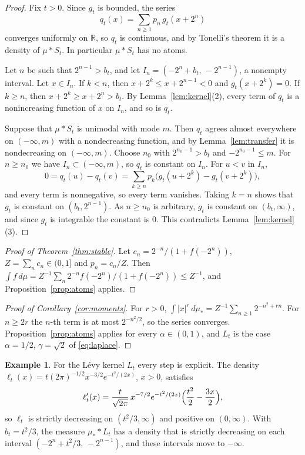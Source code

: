 \documentclass[11pt]{amsart}
\numberwithin{equation}{section}
\theoremstyle{definition}
\newtheorem{example}[theorem]{Example}
\theoremstyle{remark}
\newcommand{\R}{\mathbb R}
\begin{document}
\begin{proof}
Fix $t>0$. Since $g_t$ is bounded, the series
\[
q_t(x)=\sum_{n\ge1}p_n\,g_t(x+2^n)
\]
converges uniformly on $\R$, so $q_t$ is continuous, and by Tonelli's theorem it is a density of $\mu\ast S_t$. In particular $\mu\ast S_t$ has no atoms.

Let $n$ be such that $2^{n-1}>b_t$, and let $I_n=(-2^n+b_t,\,-2^{n-1})$, a nonempty interval. Let $x\in I_n$. If $k<n$, then $x+2^k\le x+2^{n-1}<0$ and $g_t(x+2^k)=0$. If $k\ge n$, then $x+2^k\ge x+2^n>b_t$. By Lemma~\ref{lem:kernel}(2), every term of $q_t$ is a nonincreasing function of $x$ on $I_n$, and so is $q_t$.

Suppose that $\mu\ast S_t$ is unimodal with mode $m$. Then $q_t$ agrees almost everywhere on $(-\infty,m)$ with a nondecreasing function, and by Lemma~\ref{lem:transfer} it is nondecreasing on $(-\infty,m)$. Choose $n_0$ with $2^{n_0-1}>b_t$ and $-2^{n_0-1}\le m$. For $n\ge n_0$ we have $I_n\subset(-\infty,m)$, so $q_t$ is constant on $I_n$. For $u<v$ in $I_n$,
\[
0=q_t(u)-q_t(v)=\sum_{k\ge n}p_k\bigl(g_t(u+2^k)-g_t(v+2^k)\bigr),
\]
and every term is nonnegative, so every term vanishes. Taking $k=n$ shows that $g_t$ is constant on $(b_t,2^{n-1})$. As $n\ge n_0$ is arbitrary, $g_t$ is constant on $(b_t,\infty)$, and since $g_t$ is integrable the constant is $0$. This contradicts Lemma~\ref{lem:kernel}(3).
\end{proof}

\begin{proof}[Proof of Theorem~\ref{thm:stable}]
Let $c_n=2^{-n}/(1+f(-2^n))$, $Z=\sum_nc_n\in(0,1]$ and $p_n=c_n/Z$. Then $\int f\,d\mu=Z^{-1}\sum_n2^{-n}f(-2^n)/(1+f(-2^n))\le Z^{-1}$, and Proposition~\ref{prop:atoms} applies.
\end{proof}

\begin{proof}[Proof of Corollary~\ref{cor:moments}]
For $r>0$, $\int|x|^r\,d\mu_*=Z^{-1}\sum_{n\ge1}2^{-n^2+rn}$. For $n\ge2r$ the $n$-th term is at most $2^{-n^2/2}$, so the series converges. Proposition~\ref{prop:atoms} applies for every $\alpha\in(0,1)$, and $L_t$ is the case $\alpha=1/2$, $\gamma=\sqrt2$ of \eqref{eq:laplace}.
\end{proof}

\begin{example}
For the L\'evy kernel $L_t$ every step is explicit. The density $\ell_t(x)=t(2\pi)^{-1/2}x^{-3/2}e^{-t^2/(2x)}$, $x>0$, satisfies
\[
\ell_t'(x)=\frac{t}{\sqrt{2\pi}}\,x^{-7/2}e^{-t^2/(2x)}\Bigl(\frac{t^2}{2}-\frac{3x}{2}\Bigr),
\]
so $\ell_t$ is strictly decreasing on $(t^2/3,\infty)$ and positive on $(0,\infty)$. With $b_t=t^2/3$, the measure $\mu_*\ast L_t$ has a density that is strictly decreasing on each interval $(-2^n+t^2/3,\,-2^{n-1})$, and these intervals move to $-\infty$.
\end{example}
\end{document}
